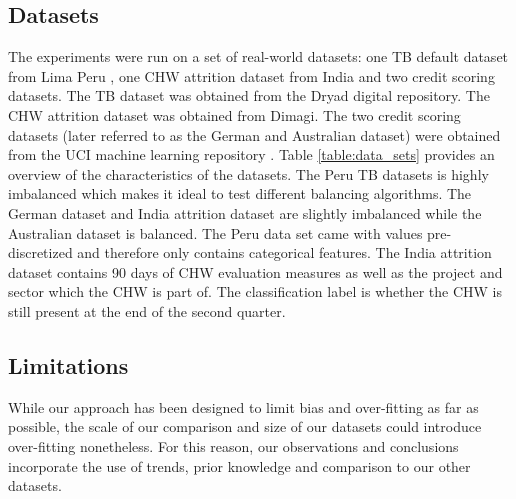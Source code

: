 \documentclass{sig-alternate-05-2015}
\begin{document}
	\subsection{Datasets}
	The experiments were run on a set of real-world datasets: one TB default dataset from Lima Peru \cite{Lackey:10356751520150601}, one CHW attrition dataset from India and two credit scoring datasets. The TB dataset was obtained from the Dryad digital repository. The CHW attrition dataset was obtained from Dimagi. The two credit scoring datasets (later referred to as the German and Australian dataset) were obtained from the UCI machine learning repository \cite{Lichman:2013}. Table \ref{table:data_sets} provides an overview of the characteristics of the datasets. The Peru TB datasets is highly imbalanced which makes it ideal to test different balancing algorithms. The German dataset and India attrition dataset are slightly imbalanced while the Australian dataset is balanced. The Peru data set came with values pre-discretized and therefore only contains categorical features. The India attrition dataset contains 90 days of CHW evaluation measures as well as the project and sector which the CHW is part of. The classification label is whether the CHW is still present at the end of the second quarter.
	\begin{table}
		\centering
		\small
		\caption{Data set summary}
		\label{table:data_sets}
	\end{table}

	\subsection{Limitations}
	While our approach has been designed to limit bias and over-fitting as far as possible, the scale of our comparison and size of our datasets could introduce over-fitting nonetheless. For this reason, our observations and conclusions incorporate the use of trends, prior knowledge and comparison to our other datasets. 
	
\end{document}
